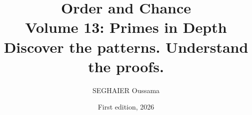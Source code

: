\documentclass[11pt,openany]{book}
\title{\Huge\textbf{Order and Chance}\\[0.4em]\LARGE Volume 13: Primes in Depth\\[0.6em]
\Large Discover the patterns. Understand the proofs.}
\author{SEGHAIER Oussama}
\date{First edition, 2026}
\begin{document}
\frontmatter
\makecover
\maketitle

\tableofcontents

\mainmatter















\end{document}
